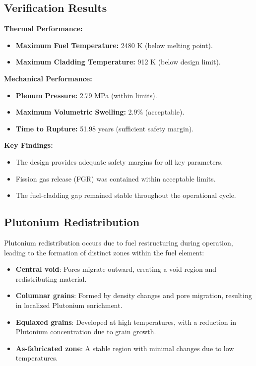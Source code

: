\documentclass[11pt,a4paper,twoside]{article}
\begin{document}
\subsection{Verification Results}
\textbf{Thermal Performance:}
\begin{itemize}
    \item \textbf{Maximum Fuel Temperature:} 2480 K (below melting point).
    \item \textbf{Maximum Cladding Temperature:} 912 K (below design limit).
\end{itemize}

\textbf{Mechanical Performance:}
\begin{itemize}
    \item \textbf{Plenum Pressure:} 2.79 MPa (within limits).
    \item \textbf{Maximum Volumetric Swelling:} 2.9\% (acceptable).
    \item \textbf{Time to Rupture:} 51.98 years (sufficient safety margin).
\end{itemize}

\textbf{Key Findings:}
\begin{itemize}
    \item The design provides adequate safety margins for all key parameters.
    \item Fission gas release (FGR) was contained within acceptable limits.
    \item The fuel-cladding gap remained stable throughout the operational cycle.
\end{itemize}

\subsection{Plutonium Redistribution}

Plutonium redistribution occurs due to fuel restructuring during operation, leading to the formation of distinct zones within the fuel element:

\begin{itemize}
    \item \textbf{Central void}: Pores migrate outward, creating a void region and redistributing material.
    \item \textbf{Columnar grains}: Formed by density changes and pore migration, resulting in localized Plutonium enrichment.
    \item \textbf{Equiaxed grains}: Developed at high temperatures, with a reduction in Plutonium concentration due to grain growth.
    \item \textbf{As-fabricated zone}: A stable region with minimal changes due to low temperatures.
\end{itemize}
\end{document}
